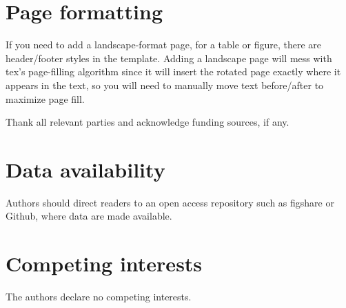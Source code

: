 \documentclass[breakmath]{seismica}
\begin{document}
\section{Page formatting}
If you need to add a landscape-format page, for a table or figure, there are header/footer styles in the template. Adding a landscape page will mess with tex's page-filling algorithm since it will insert the rotated page exactly where it appears in the text, so you will need to manually move text before/after to maximize page fill.






\begin{acknowledgements}
	Thank all relevant parties and acknowledge funding sources, if any.
\end{acknowledgements}
	
\section*{Data availability}
Authors should direct readers to an open access repository such as figshare or Github, where data are made available.

\section*{Competing interests}
The authors declare no competing interests.

 
	
\end{document}
